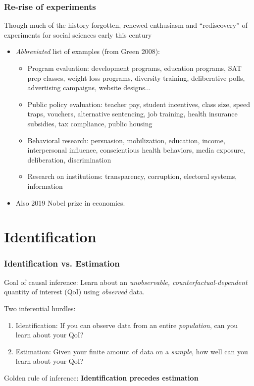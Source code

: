 \documentclass[xcolor=dvipsnames]{beamer}
\begin{document}
\begin{frame}
  \frametitle{Re-rise of experiments}
\small
{}  Though much of the history forgotten, renewed enthusiasm and ``rediscovery'' of experiments for social sciences early this century
\begin{itemize}
  \item {\it Abbreviated} list of examples (from Green 2008):
  \begin{itemize}
  \addtolength{\itemsep}{.25\baselineskip}
  \smallskip
  \footnotesize
    \item \alert{Program evaluation}: development programs, education programs, SAT prep classes, weight loss programs,  diversity training, deliberative polls, advertising campaigns, website designs...
    \item \alert{Public policy evaluation}: teacher pay, student incentives, class size,
      speed traps, vouchers, alternative sentencing, job training,
      health insurance subsidies, tax compliance, public housing
    \item \alert{Behavioral research}: persuasion, mobilization, education, income, interpersonal influence, conscientious health behaviors, media exposure, deliberation, discrimination
    \item \alert{Research on institutions}: transparency, corruption, electoral systems, information
  \end{itemize}
  \item Also 2019 Nobel prize in economics.
\end{itemize}

\end{frame}


\section{Identification}

\begin{frame}
  \frametitle{Identification vs. Estimation}
  \small
Goal of causal inference: Learn about an \textit{unobservable, counterfactual-dependent} quantity of interest (QoI) using {\it observed} data.\\

\pause

\medskip
Two inferential hurdles:

\begin{enumerate}
\item \alert{Identification}: If you can observe data from an entire {\it population}, can you learn about your QoI?
\item \alert{Estimation}: Given your finite amount of data on a {\it sample}, how well can you learn about your QoI?
\end{enumerate}
\pause
\begin{center}
Golden rule of inference: \textbf{Identification precedes estimation}
\end{center}
\end{frame}
\end{document}
